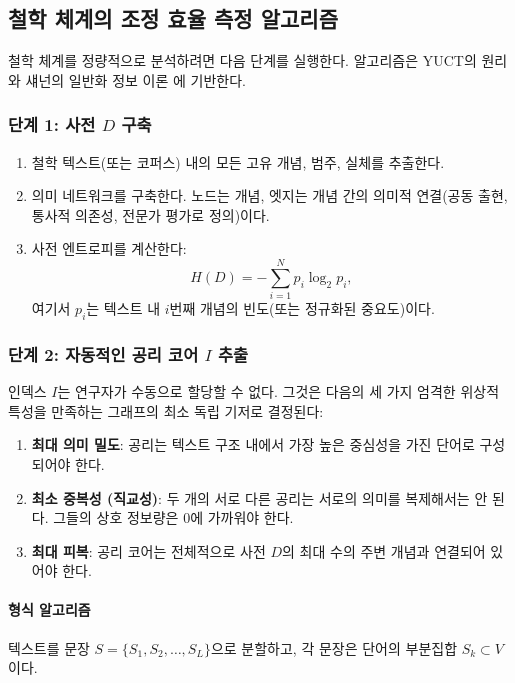 \documentclass[11pt,a4paper]{article}
\begin{document}
	\subsection{철학 체계의 조정 효율 측정 알고리즘}
	\label{subsec:measurement-algorithm}
	
	철학 체계를 정량적으로 분석하려면 다음 단계를 실행한다. 알고리즘은 YUCT의 원리와 섀넌의 일반화 정보 이론 \cite{AppendixX}에 기반한다.
	
	\subsubsection{단계 1: 사전 \(D\) 구축}
	
	\begin{enumerate}
		\item 철학 텍스트(또는 코퍼스) 내의 모든 고유 개념, 범주, 실체를 추출한다.
		\item 의미 네트워크를 구축한다. 노드는 개념, 엣지는 개념 간의 의미적 연결(공동 출현, 통사적 의존성, 전문가 평가로 정의)이다.
		\item 사전 엔트로피를 계산한다:
		\[
		H(D) = -\sum_{i=1}^{N} p_i \log_2 p_i,
		\]
		여기서 \(p_i\)는 텍스트 내 \(i\)번째 개념의 빈도(또는 정규화된 중요도)이다.
	\end{enumerate}
	
	\subsubsection{단계 2: 자동적인 공리 코어 \(I\) 추출}
	\label{sec:auto-basis}
	
	인덱스 \(I\)는 연구자가 수동으로 할당할 수 없다. 그것은 다음의 세 가지 엄격한 위상적 특성을 만족하는 그래프의 최소 독립 기저로 결정된다:
	\begin{enumerate}
		\item \textbf{최대 의미 밀도}: 공리는 텍스트 구조 내에서 가장 높은 중심성을 가진 단어로 구성되어야 한다.
		\item \textbf{최소 중복성 (직교성)}: 두 개의 서로 다른 공리는 서로의 의미를 복제해서는 안 된다. 그들의 상호 정보량은 0에 가까워야 한다.
		\item \textbf{최대 피복}: 공리 코어는 전체적으로 사전 \(D\)의 최대 수의 주변 개념과 연결되어 있어야 한다.
	\end{enumerate}
	
	\paragraph{형식 알고리즘}
	텍스트를 문장 \(S = \{S_1, S_2, \dots, S_L\}\)으로 분할하고, 각 문장은 단어의 부분집합 \(S_k \subset V\)이다.
	
\end{document}
